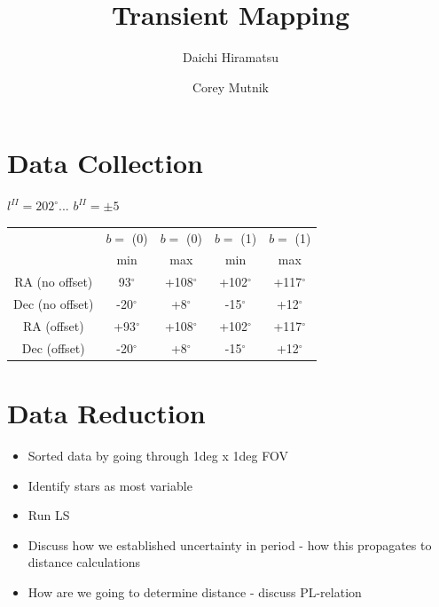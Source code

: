 \documentclass[aps,prl,twocolumn,superscriptaddress]{revtex4-1}
\begin{document}
\title{Transient Mapping}


\author{Daichi Hiramatsu}
\author{Corey Mutnik}



\begin{abstract}

\end{abstract}

\maketitle    


\section{Data Collection}
$l^{II}=202^{\circ}$...
$b^{II}=\pm5$
\begin{table}[H]
	\begin{tabular}{ | c | c | c | c | c | } \hline
		& $b=$ (0) & $b=$ (0) & $b=$ (1) & $b=$ (1) \\
		& min & max & min & max \\ \hline \hline
		RA (no offset) & 93$^{\circ}$ & +108$^{\circ}$ & +102$^{\circ}$ & +117$^{\circ}$  \\ \hline
		Dec (no offset) & -20$^{\circ}$ & +8$^{\circ}$ & -15$^{\circ}$ & +12$^{\circ}$ \\ \hline
		RA (offset) & +93$^{\circ}$ & +108$^{\circ}$ & +102$^{\circ}$ & +117$^{\circ}$ \\ \hline
		Dec (offset) & -20$^{\circ}$ & +8$^{\circ}$ & -15$^{\circ}$ & +12$^{\circ}$ \\ \hline
	\end{tabular}
\end{table}

\section{Data Reduction}

\begin{itemize}
	\item{} Sorted data by going through 1deg x 1deg FOV
	\item{} Identify stars as most variable
	\item{} Run LS
	\item{} Discuss how we established uncertainty in period - how this propagates to distance calculations
	\item{} How are we going to determine distance - discuss PL-relation
\end{itemize}
\end{document}
